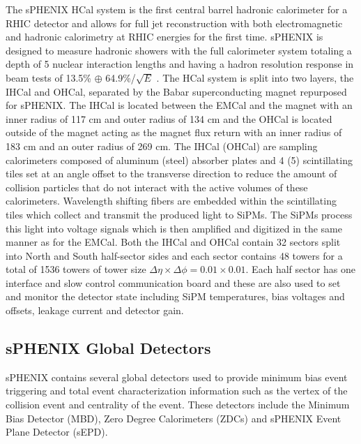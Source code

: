 The sPHENIX HCal system is the first central barrel hadronic calorimeter for a RHIC detector and allows for full jet reconstruction with both electromagnetic and hadronic calorimetry at RHIC energies for the first time. 
sPHENIX is designed to measure hadronic showers with the full calorimeter system totaling a depth of 5 nuclear interaction lengths and having a hadron resolution response in beam tests of 13.5\% $\oplus$ 64.9\%/$\sqrt{E}$ \cite{emcal_hcal_beamtest}. 
The HCal system is split into two layers, the IHCal and OHCal, separated by the Babar superconducting magnet repurposed for sPHENIX.
The IHCal is located between the EMCal and the magnet with an inner radius of 117 cm and outer radius of 134 cm and the OHCal is located outside of the magnet acting as the magnet flux return with an inner radius of 183 cm and an outer radius of 269 cm.
The IHCal (OHCal) are sampling calorimeters composed of aluminum (steel) absorber plates and 4 (5) scintillating tiles set at an angle offset to the transverse direction to reduce the amount of collision particles that do not interact with the active volumes of these calorimeters. 
Wavelength shifting fibers are embedded within the scintillating tiles which collect and transmit the produced light to SiPMs.
The SiPMs process this light into voltage signals which is then amplified and digitized in the same manner as for the EMCal.
Both the IHCal and OHCal contain 32 sectors split into North and South half-sector sides and each sector contains 48 towers for a total of 1536 towers of tower size  $\Delta \eta \times \Delta \phi = 0.01 \times 0.01$.
Each half sector has one interface and slow control communication board and these are also used to set and monitor the detector state including SiPM temperatures, bias voltages and offsets, leakage current and detector gain.

\subsection{sPHENIX Global Detectors}
sPHENIX contains several global detectors used to provide minimum bias event triggering and total event characterization information such as the vertex of the collision event and centrality of the event.
These detectors include the Minimum Bias Detector (MBD), Zero Degree Calorimeters (ZDCs) and sPHENIX Event Plane Detector (sEPD). 

